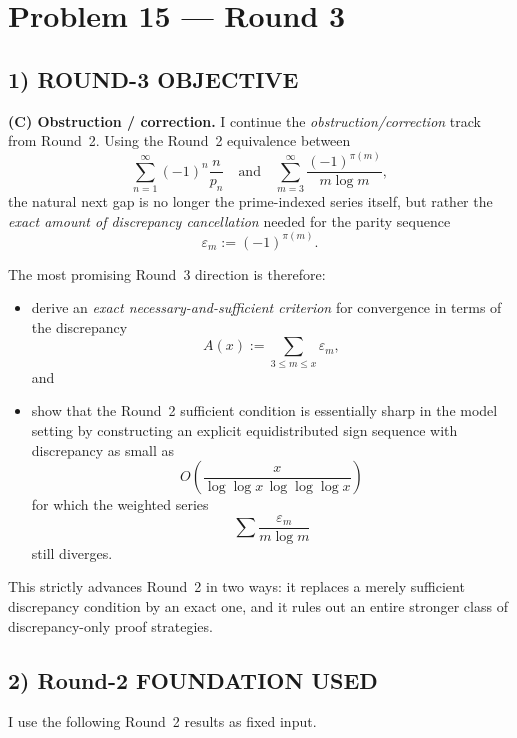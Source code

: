 \section{Problem 15 --- Round 3}

\subsection*{1) ROUND-3 OBJECTIVE}

\textbf{(C) Obstruction / correction.}
I continue the \emph{obstruction/correction} track from Round~2.
Using the Round~2 equivalence between
\[
\sum_{n=1}^\infty (-1)^n \frac{n}{p_n}
\quad\text{and}\quad
\sum_{m=3}^\infty \frac{(-1)^{\pi(m)}}{m\log m},
\]
the natural next gap is no longer the prime-indexed series itself, but rather the
\emph{exact amount of discrepancy cancellation} needed for the parity sequence
\[
\varepsilon_m := (-1)^{\pi(m)}.
\]

The most promising Round~3 direction is therefore:

\begin{itemize}
\item derive an \emph{exact necessary-and-sufficient criterion} for convergence in terms of the discrepancy
\[
A(x):=\sum_{3\le m\le x}\varepsilon_m,
\]
and
\item show that the Round~2 sufficient condition is essentially sharp in the model setting by constructing an explicit equidistributed sign sequence with discrepancy as small as
\[
O\!\left(\frac{x}{\log\log x\,\log\log\log x}\right)
\]
for which the weighted series
\[
\sum \frac{\varepsilon_m}{m\log m}
\]
still diverges.
\end{itemize}

This strictly advances Round~2 in two ways:
it replaces a merely sufficient discrepancy condition by an exact one, and it rules out an entire stronger class of discrepancy-only proof strategies.

\subsection*{2) Round-2 FOUNDATION USED}

I use the following Round~2 results as fixed input.


